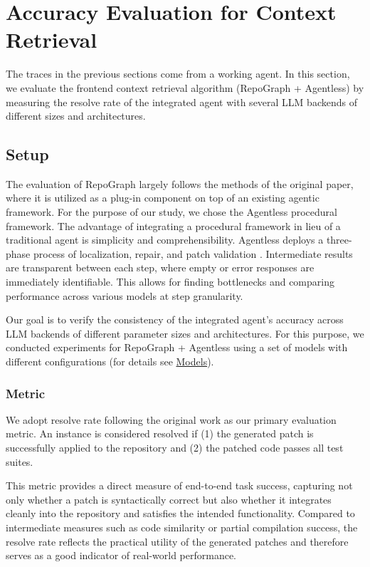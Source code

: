 \section{Accuracy Evaluation for Context Retrieval}
\label{sec:ch1_eval}

The traces in the previous sections come from a working agent. In this section, we evaluate the frontend context retrieval algorithm (RepoGraph + Agentless) by measuring the resolve rate of the integrated agent with several LLM backends of different sizes and architectures.

\subsection{Setup}
The evaluation of RepoGraph largely follows the methods of the original paper, where it is utilized as a plug-in component on top of an existing agentic framework. For the purpose of our study, we chose the Agentless procedural framework. The advantage of integrating a procedural framework in lieu of a traditional agent is simplicity and comprehensibility. Agentless deploys a three-phase process of localization, repair, and patch validation \cite{xia2024agentlessdemystifyingllmbasedsoftware}. Intermediate results are transparent between each step, where empty or error responses are immediately identifiable. This allows for finding bottlenecks and comparing performance across various models at step granularity.

Our goal is to verify the consistency of the integrated agent's accuracy across LLM backends of different parameter sizes and architectures. For this purpose, we conducted experiments for RepoGraph + Agentless using a set of models with different configurations (for details see \hyperref[sec:ch1_eval_model]{Models}).

\subsubsection{Metric}
We adopt resolve rate following the original work as our primary evaluation metric. An instance is considered resolved if (1) the generated patch is successfully applied to the repository and (2) the patched code passes all test suites.

This metric provides a direct measure of end-to-end task success, capturing not only whether a patch is syntactically correct but also whether it integrates cleanly into the repository and satisfies the intended functionality. Compared to intermediate measures such as code similarity or partial compilation success, the resolve rate reflects the practical utility of the generated patches and therefore serves as a good indicator of real-world performance.

